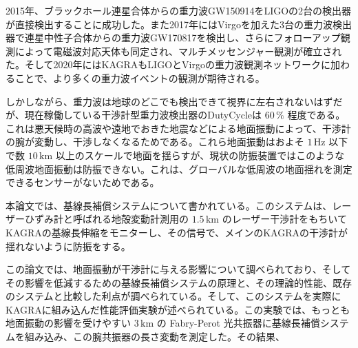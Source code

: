 2015年、ブラックホール連星合体からの重力波GW150914をLIGOの2台の検出器が直接検出することに成功した。また2017年にはVirgoを加えた3台の重力波検出器で連星中性子合体からの重力波GW170817を検出し、さらにフォローアップ観測によって電磁波対応天体も同定され、マルチメッセンジャー観測が確立された。そして2020年にはKAGRAもLIGOとVirgoの重力波観測ネットワークに加わることで、より多くの重力波イベントの観測が期待される。

しかしながら、重力波は地球のどこでも検出できて視界に左右されないはずだが、現在稼働している干渉計型重力波検出器のDutyCycleは $60\,\%$ 程度である。これは悪天候時の高波や遠地でおきた地震などによる地面振動によって、干渉計の腕が変動し、干渉しなくなるためである。これら地面振動はおよそ $1\, \mathrm{Hz}$ 以下で数 $10\,\mathrm{km}$ 以上のスケールで地面を揺らすが、現状の防振装置ではこのような低周波地面振動は防振できない。これは、グローバルな低周波の地面揺れを測定できるセンサーがないためである。

本論文では、基線長補償システムについて書かれている。このシステムは、レーザーひずみ計と呼ばれる地殻変動計測用の $1.5\,\mathrm{km}$ のレーザー干渉計をもちいてKAGRAの基線長伸縮をモニターし、その信号で、メインのKAGRAの干渉計が揺れないように防振をする。

この論文では、地面振動が干渉計に与える影響について調べられており、そしてその影響を低減するための基線長補償システムの原理と、その理論的性能、既存のシステムと比較した利点が調べられている。そして、このシステムを実際にKAGRAに組み込んだ性能評価実験が述べられている。この実験では、もっとも地面振動の影響を受けやすい $3\,\mathrm{km}$ の Fabry-Perot 光共振器に基線長補償システムを組み込み、この腕共振器の長さ変動を測定した。その結果、
